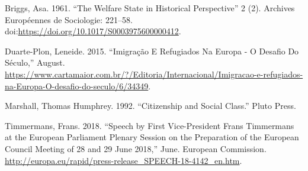 \documentclass[]{elsarticle} %
\begin{document}
\hypertarget{refs}{}
\hypertarget{ref-briggs}{}
Briggs, Asa. 1961. ``The Welfare State in Historical Perspective'' 2
(2). Archives Européennes de Sociologie: 221--58.
doi:\href{https://doi.org/https://doi.org/10.1017/S0003975600000412}{https://doi.org/10.1017/S0003975600000412}.

\hypertarget{ref-leneide}{}
Duarte-Plon, Leneide. 2015. ``Imigração E Refugiados Na Europa - O
Desafio Do Século,'' August.
\url{https://www.cartamaior.com.br/?/Editoria/Internacional/Imigracao-e-refugiados-na-Europa-O-desafio-do-seculo/6/34349}.

\hypertarget{ref-marshall}{}
Marshall, Thomas Humphrey. 1992. ``Citizenship and Social Class.'' Pluto
Press.

\hypertarget{ref-franstimmermans}{}
Timmermans, Frans. 2018. ``Speech by First Vice-President Frans
Timmermans at the European Parliament Plenary Session on the Preparation
of the European Council Meeting of 28 and 29 June 2018,'' June. European
Commission.
\url{http://europa.eu/rapid/press-release_SPEECH-18-4142_en.htm}.
\end{document}
